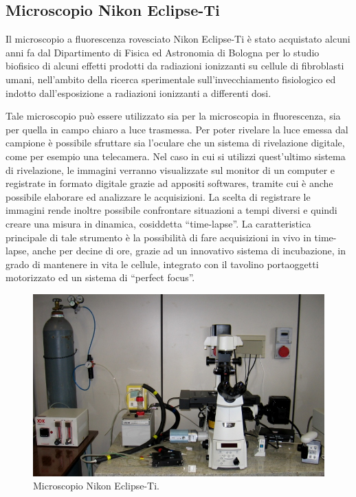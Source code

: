 \subsection{Microscopio Nikon Eclipse-Ti}

Il microscopio a fluorescenza rovesciato Nikon Eclipse-Ti è stato acquistato alcuni anni fa dal Dipartimento di Fisica ed Astronomia di Bologna per lo studio biofisico di alcuni effetti prodotti da radiazioni ionizzanti su cellule di fibroblasti umani, nell'ambito della ricerca sperimentale sull'invecchiamento fisiologico ed indotto dall'esposizione a radiazioni ionizzanti a differenti dosi. 

Tale microscopio può essere utilizzato sia per la microscopia in fluorescenza, sia per quella in campo chiaro a luce trasmessa.
Per poter rivelare la luce emessa dal campione è possibile sfruttare sia l'oculare che un sistema di rivelazione digitale, come per esempio una telecamera.
Nel caso in cui si utilizzi quest'ultimo sistema di rivelazione, le immagini verranno visualizzate sul monitor di un computer e registrate in formato digitale grazie ad appositi softwares, tramite cui è anche possibile elaborare ed analizzare le acquisizioni. 
La scelta di registrare le immagini rende inoltre possibile confrontare situazioni a tempi diversi e quindi creare una misura in dinamica, cosiddetta ``time-lapse''. 
La caratteristica principale di tale strumento è la possibilità di fare acquisizioni in vivo in time-lapse, anche per decine di ore, grazie ad un innovativo sistema di incubazione, in grado di mantenere in vita le cellule, integrato con il tavolino portaoggetti motorizzato ed un sistema di ``perfect focus''.

\begin{figure}
 \centering
 \includegraphics[scale=.45]{img/CAP2microNIKON.png}
 \caption{\small{Microscopio Nikon Eclipse-Ti.}}
 \label{fig:NIKON}
\end{figure}

